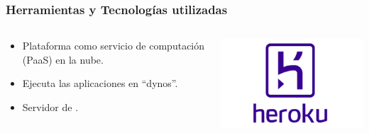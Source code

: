 \begin{frame}
	\frametitle{Herramientas y Tecnologías utilizadas}
	\begin{columns}
			\begin{column}{0.6\textwidth}
					\begin{itemize}
						\item {Plataforma como servicio de computación (PaaS) en la nube}.
						\item {Ejecuta las aplicaciones en ``dynos''.}
						\item {Servidor de \ULLAR{}}.
					\end{itemize}
				\endblock{}
			\end{column}
			\begin{column}{0.4\textwidth}
				\vfill 
					\begin{center}
						\includegraphics[width=0.9\linewidth]{Images/heroku}
					\end{center}
			\end{column}
	\end{columns}
\end{frame}

